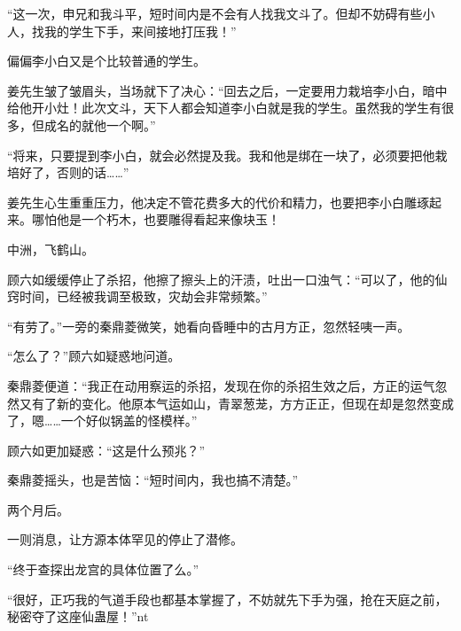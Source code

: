 \begin{this_body}
“这一次，申兄和我斗平，短时间内是不会有人找我文斗了。但却不妨碍有些小人，找我的学生下手，来间接地打压我！”

偏偏李小白又是个比较普通的学生。

姜先生皱了皱眉头，当场就下了决心：“回去之后，一定要用力栽培李小白，暗中给他开小灶！此次文斗，天下人都会知道李小白就是我的学生。虽然我的学生有很多，但成名的就他一个啊。”

“将来，只要提到李小白，就会必然提及我。我和他是绑在一块了，必须要把他栽培好了，否则的话……”

姜先生心生重重压力，他决定不管花费多大的代价和精力，也要把李小白雕琢起来。哪怕他是一个朽木，也要雕得看起来像块玉！

中洲，飞鹤山。

顾六如缓缓停止了杀招，他擦了擦头上的汗渍，吐出一口浊气：“可以了，他的仙窍时间，已经被我调至极致，灾劫会非常频繁。”

“有劳了。”一旁的秦鼎菱微笑，她看向昏睡中的古月方正，忽然轻咦一声。

“怎么了？”顾六如疑惑地问道。

秦鼎菱便道：“我正在动用察运的杀招，发现在你的杀招生效之后，方正的运气忽然又有了新的变化。他原本气运如山，青翠葱茏，方方正正，但现在却是忽然变成了，嗯……一个好似锅盖的怪模样。”

顾六如更加疑惑：“这是什么预兆？”

秦鼎菱摇头，也是苦恼：“短时间内，我也搞不清楚。”

两个月后。

一则消息，让方源本体罕见的停止了潜修。

“终于查探出龙宫的具体位置了么。”

“很好，正巧我的气道手段也都基本掌握了，不妨就先下手为强，抢在天庭之前，秘密夺了这座仙蛊屋！”nt

\end{this_body}


